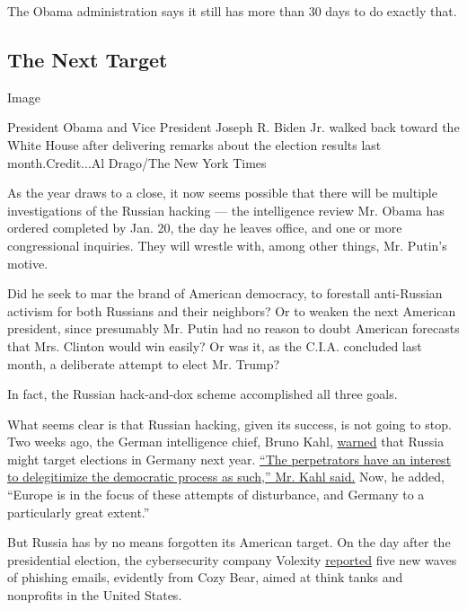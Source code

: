 The Obama administration says it still has more than 30 days to do
exactly that.

\hypertarget{the-next-target}{%
\subsection{The Next Target}\label{the-next-target}}

Image

President Obama and Vice President Joseph R. Biden Jr. walked back
toward the White House after delivering remarks about the election
results last month.Credit...Al Drago/The New York Times

As the year draws to a close, it now seems possible that there will be
multiple investigations of the Russian hacking --- the intelligence
review Mr. Obama has ordered completed by Jan. 20, the day he leaves
office, and one or more congressional inquiries. They will wrestle with,
among other things, Mr. Putin's motive.

Did he seek to mar the brand of American democracy, to forestall
anti-Russian activism for both Russians and their neighbors? Or to
weaken the next American president, since presumably Mr. Putin had no
reason to doubt American forecasts that Mrs. Clinton would win easily?
Or was it, as the C.I.A. concluded last month, a deliberate attempt to
elect Mr. Trump?

In fact, the Russian hack-and-dox scheme accomplished all three goals.

What seems clear is that Russian hacking, given its success, is not
going to stop. Two weeks ago, the German intelligence chief, Bruno Kahl,
\href{http://www.sueddeutsche.de/politik/bruno-kahl-im-interview-stoerversuche-aus-russland-1.3270241}{warned}
that Russia might target elections in Germany next year.
\href{http://www.nytimes3xbfgragh.onion/aponline/2016/11/29/world/europe/ap-eu-germany-cyberattacks.html}{``The
perpetrators have an interest to delegitimize the democratic process as
such,'' Mr. Kahl said.} Now, he added, ``Europe is in the focus of these
attempts of disturbance, and Germany to a particularly great extent.''

But Russia has by no means forgotten its American target. On the day
after the presidential election, the cybersecurity company Volexity
\href{https://www.volexity.com/blog/2016/11/09/powerduke-post-election-spear-phishing-campaigns-targeting-think-tanks-and-ngos/}{reported}
five new waves of phishing emails, evidently from Cozy Bear, aimed at
think tanks and nonprofits in the United States.

